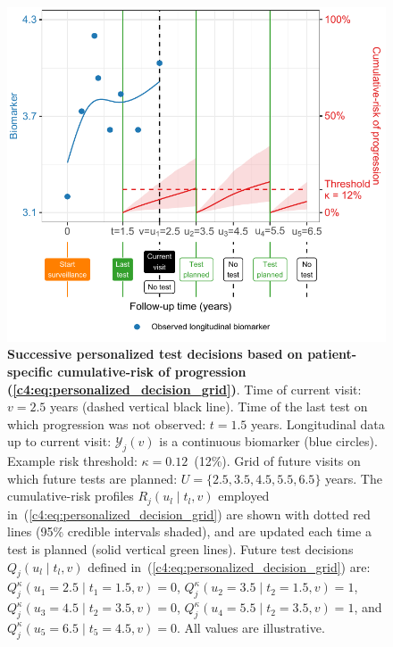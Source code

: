\begin{figure}
\centerline{\includegraphics{contents/c4/images/c4_fig3.pdf}}
\caption{\textbf{Successive personalized test decisions based on patient-specific cumulative-risk of progression (\ref{c4:eq:personalized_decision_grid})}. Time of current visit: $v=2.5$ years (dashed vertical black line). Time of the last test on which progression was not observed: $t=1.5$ years. Longitudinal data up to current visit: $\mathcal{Y}_j(v)$ is a continuous biomarker (blue circles). Example risk threshold: $\kappa=0.12$~(12\%). Grid of future visits on which future tests are planned: $U = \{2.5, 3.5, 4.5, 5.5, 6.5\}$ years. The cumulative-risk profiles $R_j(u_l \mid t_l, v)$ employed in~(\ref{c4:eq:personalized_decision_grid}) are shown with dotted red lines (95\% credible intervals shaded), and are updated each time a test is planned (solid vertical green lines). Future test decisions $Q_j(u_l \mid t_l, v)$ defined in~(\ref{c4:eq:personalized_decision_grid}) are: $Q_j^\kappa(u_1=2.5\mid t_1=1.5,v)=0$, $Q_j^\kappa(u_2=3.5\mid t_2=1.5,v)=1$, $Q_j^\kappa(u_3=4.5\mid t_2=3.5,v)=0$, $Q_j^\kappa(u_4=5.5\mid t_2=3.5,v)=1$, and $Q_j^\kappa(u_5=6.5\mid t_5=4.5,v)=0$. All values are illustrative.} 
\label{c4:fig:3}
\end{figure}

